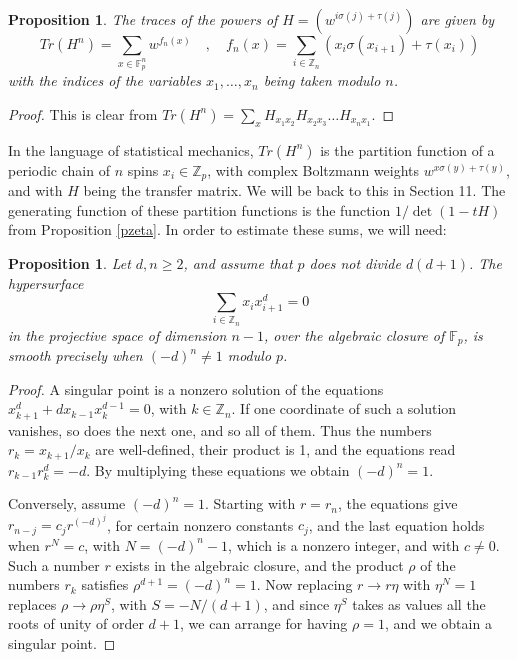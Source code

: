\documentclass[11pt]{amsart}
\newtheorem{proposition}[theorem]{Proposition}
\theoremstyle{definition}
\begin{document}
\begin{proposition}\label{ptra}
The traces of the powers of $H=(w^{i\sigma(j)+\tau(j)})$ are given by
$$Tr(H^n)=\sum_{x\in\mathbb F_p^n}w^{f_n(x)}\quad,\quad f_n(x)=\sum_{i\in\mathbb Z_n}\left(x_i\sigma(x_{i+1})+\tau(x_i)\right)$$
with the indices of the variables $x_1,\ldots,x_n$ being taken modulo $n$.
\end{proposition}

\begin{proof}
This is clear from $Tr(H^n)=\sum_xH_{x_1x_2}H_{x_2x_3}\ldots H_{x_nx_1}$.
\end{proof}

In the language of statistical mechanics, $Tr(H^n)$ is the partition function of a periodic chain of $n$ spins $x_i\in\mathbb Z_p$, with complex Boltzmann weights $w^{x\sigma(y)+\tau(y)}$, and with $H$ being the transfer matrix. We will be back to this in Section 11. The generating function of these partition functions is the function $1/\det(1-tH)$ from Proposition \ref{pzeta}. In order to estimate these sums, we will need:

\begin{proposition}\label{psmo}
Let $d,n\geq2$, and assume that $p$ does not divide $d(d+1)$. The hypersurface
$$\sum_{i\in\mathbb Z_n}x_ix_{i+1}^d=0$$
in the projective space of dimension $n-1$, over the algebraic closure of $\mathbb F_p$, is smooth precisely when $(-d)^n\neq1$ modulo $p$.
\end{proposition}

\begin{proof}
A singular point is a nonzero solution of the equations $x_{k+1}^d+dx_{k-1}x_k^{d-1}=0$, with $k\in\mathbb Z_n$. If one coordinate of such a solution vanishes, so does the next one, and so all of them. Thus the numbers $r_k=x_{k+1}/x_k$ are well-defined, their product is 1, and the equations read $r_{k-1}r_k^d=-d$. By multiplying these equations we obtain $(-d)^n=1$.

\medskip

Conversely, assume $(-d)^n=1$. Starting with $r=r_n$, the equations give $r_{n-j}=c_jr^{(-d)^j}$, for certain nonzero constants $c_j$, and the last equation holds when $r^N=c$, with $N=(-d)^n-1$, which is a nonzero integer, and with $c\neq0$. Such a number $r$ exists in the algebraic closure, and the product $\rho$ of the numbers $r_k$ satisfies $\rho^{d+1}=(-d)^n=1$. Now replacing $r\to r\eta$ with $\eta^N=1$ replaces $\rho\to\rho\eta^S$, with $S=-N/(d+1)$, and since $\eta^S$ takes as values all the roots of unity of order $d+1$, we can arrange for having $\rho=1$, and we obtain a singular point.
\end{proof}
\end{document}
